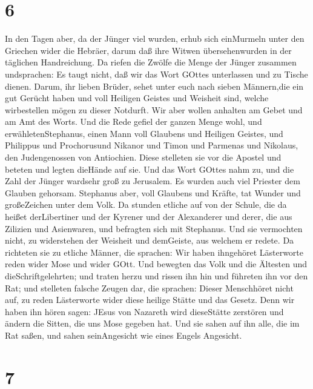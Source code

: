 \hypertarget{section-5}{%
\section{6}\label{section-5}}

 In den Tagen aber, da der Jünger viel wurden, erhub sich
einMurmeln unter den Griechen wider die Hebräer, darum daß ihre Witwen
übersehenwurden in der täglichen Handreichung.  Da riefen
die Zwölfe die Menge der Jünger zusammen undsprachen: Es taugt nicht,
daß wir das Wort GOttes unterlassen und zu Tische dienen. 
Darum, ihr lieben Brüder, sehet unter euch nach sieben Männern,die ein
gut Gerücht haben und voll Heiligen Geistes und Weisheit sind, welche
wirbestellen mögen zu dieser Notdurft.  Wir aber wollen
anhalten am Gebet und am Amt des Worts.  Und die Rede gefiel
der ganzen Menge wohl, und erwähletenStephanus, einen Mann voll Glaubens
und Heiligen Geistes, und Philippus und Prochorusund Nikanor und Timon
und Parmenas und Nikolaus, den Judengenossen von Antiochien.
 Diese stelleten sie vor die Apostel und beteten und legten
dieHände auf sie.  Und das Wort GOttes nahm zu, und die Zahl
der Jünger wardsehr groß zu Jerusalem. Es wurden auch viel Priester dem
Glauben gehorsam.  Stephanus aber, voll Glaubens und Kräfte,
tat Wunder und großeZeichen unter dem Volk.  Da stunden
etliche auf von der Schule, die da heißet derLibertiner und der Kyrener
und der Alexanderer und derer, die aus Zilizien und Asienwaren, und
befragten sich mit Stephanus.  Und sie vermochten nicht, zu
widerstehen der Weisheit und demGeiste, aus welchem er redete.
 Da richteten sie zu etliche Männer, die sprachen: Wir
haben ihngehöret Lästerworte reden wider Mose und wider GOtt.
 Und bewegten das Volk und die Ältesten und
dieSchriftgelehrten; und traten herzu und rissen ihn hin und führeten
ihn vor den Rat;  und stelleten falsche Zeugen dar, die
sprachen: Dieser Menschhöret nicht auf, zu reden Lästerworte wider diese
heilige Stätte und das Gesetz.  Denn wir haben ihn hören
sagen: JEsus von Nazareth wird dieseStätte zerstören und ändern die
Sitten, die uns Mose gegeben hat.  Und sie sahen auf ihn
alle, die im Rat saßen, und sahen seinAngesicht wie eines Engels
Angesicht.

\hypertarget{section-6}{%
\section{7}\label{section-6}}

